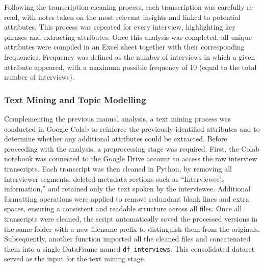 \documentclass[a4paper, 12pt, twoside]{report}  %
\begin{document}
\indent Following the transcription cleaning process, each transcription was carefully re-read, with notes taken on the most relevant insights and linked to potential attributes. This process was repeated for every interview, highlighting key phrases and extracting attributes. Once this analysis was completed, all unique attributes were compiled in an Excel sheet together with their corresponding frequencies. Frequency was defined as the number of interviews in which a given attribute appeared, with a maximum possible frequency of 10 (equal to the total number of interviews).

\subsubsection{Text Mining and Topic Modelling}

\indent Complementing the previous manual analysis, a text mining process was conducted in Google Colab to reinforce the previously identified attributes and to determine whether any additional attributes could be extracted. Before proceeding with the analysis, a preprocessing stage was required. First, the Colab notebook was connected to the Google Drive account to access the raw interview transcripts. Each transcript was then cleaned in Python, by removing all interviewer segments, deleted metadata sections such as “Interviewee’s information,” and retained only the text spoken by the interviewee. Additional formatting operations were applied to remove redundant blank lines and extra spaces, ensuring a consistent and readable structure across all files. Once all transcripts were cleaned, the script automatically saved the processed versions in the same folder with a new filename prefix to distinguish them from the originals. Subsequently, another function imported all the cleaned files and concatenated them into a single DataFrame named \texttt{df\_interviews}. This consolidated dataset served as the input for the text mining stage.
\end{document}
